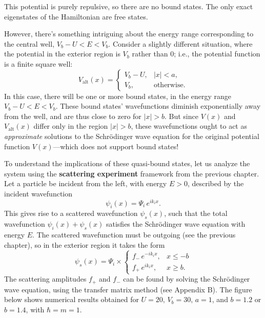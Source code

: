 \documentclass[pra,12pt]{revtex4}
\begin{document}
This potential is purely repulsive, so there are no bound states.  The
only exact eigenstates of the Hamiltonian are free states.

However, there's something intriguing about the energy range
corresponding to the central well, $V_b-U < E < V_b$.  Consider a
slightly different situation, where the potential in the exterior
region is $V_b$ rather than $0$; i.e., the potential function is a
finite square well:
\begin{equation}
  V_{\mathrm{alt}}(x) = \begin{cases}V_b - U, & |x| < a, \\ V_b, & \mathrm{otherwise}.\end{cases}
\end{equation}
In this case, there will be one or more bound states, in the energy
range $V_b-U < E < V_b$.  These bound states' wavefunctions diminish
exponentially away from the well, and are thus close to zero for $|x|
> b$.  But since $V(x)$ and $V_{\mathrm{alt}}(x)$ differ only in the
region $|x| > b$, these wavefunctions ought to act as
\textit{approximate} solutions to the Schr\"odinger wave equation for
the original potential function $V(x)$---which does not support bound
states!

To understand the implications of these quasi-bound states, let us
analyze the system using the \textbf{scattering experiment} framework
from the previous chapter.  Let a particle be incident from the left,
with energy $E > 0$, described by the incident wavefunction
\begin{equation}
  \psi_i(x) = \Psi_i \, e^{ik_i x}.
\end{equation}
This gives rise to a scattered wavefunction $\psi_s(x)$, such that the
total wavefunction $\psi_i(x) + \psi_s(x)$ satisfies the Schr\"odinger
wave equation with energy $E$.  The scattered wavefunction must be
outgoing (see the previous chapter), so in the exterior region it
takes the form
\begin{equation}
  \psi_s(x) = \Psi_i \times \begin{cases}f_- \,e^{-ik_ix}, & x \le -b \\ f_+ \,e^{ik_ix}, & x \ge b.\end{cases}
\end{equation}
The scattering amplitudes $f_+$ and $f_-$ can be found by solving the
Schr\"odinger wave equation, using the transfer matrix method (see
Appendix B).  The figure below shows numerical results obtained for
$U = 20,\,V_b = 30,\,a=1$, and $b = 1.2$ or $b = 1.4$, with $\hbar =
m = 1$.
\end{document}
